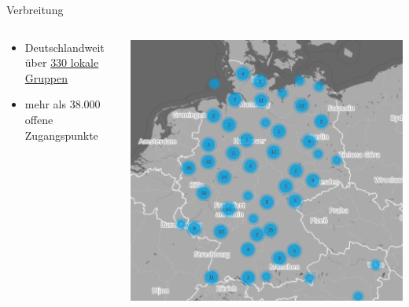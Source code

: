 \documentclass[t]{beamer}
\begin{document}
  \begin{frame}{Verbreitung}
    \begin{columns}
      \begin{column}{0.6\textwidth}
        \begin{itemize}
          \item Deutschlandweit über  \href{http://freifunk.net/wie-mache-ich-mit/community-finden/}{330 lokale Gruppen}
          \item mehr als 38.000 offene Zugangspunkte
        \end{itemize}
      \end{column}
      \begin{column}{0.4\textwidth}
        \begin{center}
          \includegraphics[width=\textwidth]{images/2016-06-01_map-de}
        \end{center}
      \end{column}
    \end{columns}
  \end{frame}
  
\end{document}
